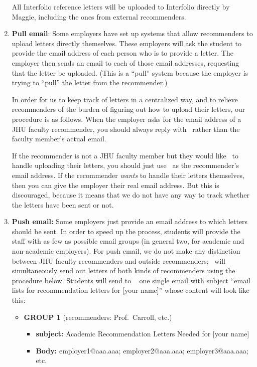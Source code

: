 \documentclass{econtex}
\begin{document}
\begin{enumerate}
All Interfolio reference letters will be uploaded to Interfolio directly by Maggie, including the ones from external recommenders.

\item {\bf Pull email}: Some employers have set up systems that allow
  recommenders to upload letters directly themselves.  These employers
  will ask the student to provide the email address of each person who
  is to provide a letter.  The employer then sends an email to each of
  those email addresses, requesting that the letter be uploaded.
  (This is a ``pull'' system because the employer is trying to
  ``pull'' the letter from the recommender.)

  In order for us to keep track of letters in a centralized way, and
  to relieve recommenders of the burden of figuring out how to
  upload their letters, our procedure is as follows.  When the
  employer asks for the email address of a JHU faculty recommender, you should
  always reply with \JMStaffEmail~rather than the faculty member's
  actual email.

  If the recommender is not a JHU faculty member but they would like \JMStaff~to handle uploading their letters, you should just use \JMStaffEmail~as the recommender's email address.  If the recommender {\it wants} to handle their letters themselves, then you can give the employer their real email address.  But this is discouraged, because it means that we do not have any way to track whether the letters have been sent or not.

\item {\bf Push email:} Some employers just provide an email address
  to which letters should be sent.  In order to speed up the process,
  students will provide the staff with as few as possible email groups
  (in general two, for academic and non-academic employers). For push email, we do not 
make any distinction between JHU faculty recommenders and outside recommenders; \JMStaff~will
simultaneously send out letters of both kinds of recommenders using the procedure below.  Students will send to \JMStaffEmail~ one single email
  with subject ``email lists for recommendation letters for [your
  name]'' whose content will look like this: \small
\begin{itemize}
\item {\bf  GROUP 1} (recommenders: Prof.\ Carroll, etc.)
\begin{itemize}
\item {\bf  subject:} Academic Recommendation Letters Needed for [your name]
\item {\bf  Body:} employer1@aaa.aaa; employer2@aaa.aaa; employer3@aaa.aaa; etc.
\end{itemize}


\end{itemize}
\end{enumerate}
\end{document}
